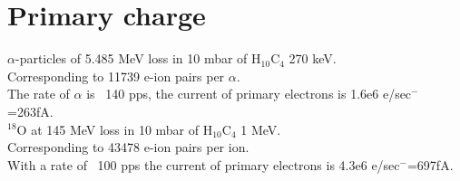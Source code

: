 \documentclass[a4paper, 11 pt]{report}
\begin{document}
\section{Primary charge}

$\alpha$-particles of 5.485 MeV loss in 10 mbar of H$_{10}$C$_4$ 270 keV.\\
Corresponding to 11739 e-ion pairs per $\alpha$.\\
The rate of $\alpha$ is ~140 pps, the current of primary electrons is 1.6e6 e/sec$^-$=263fA.\\

$^{18}$O at 145 MeV loss in 10 mbar of H$_{10}$C$_4$ 1 MeV.\\
Corresponding to 43478 e-ion pairs per ion.\\
With a rate of ~100 pps the current of primary electrons is  4.3e6 e/sec$^-$=697fA.\\


\end{document}
